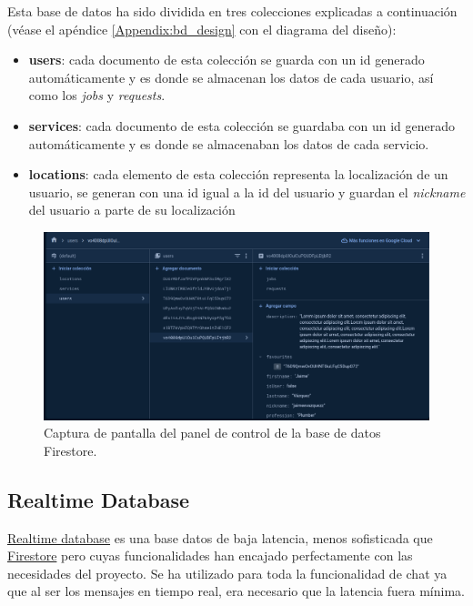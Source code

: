 Esta base de datos ha sido dividida en tres colecciones explicadas a continuación (véase el apéndice \ref{Appendix:bd_design} con el diagrama del diseño):
\begin{itemize}
    \item \textbf{users}: cada documento de esta colección se guarda con un id generado automáticamente y es donde se almacenan los datos de cada usuario, así como los \textit{jobs} y \textit{requests}.
    \item \textbf{services}: cada documento de esta colección se guardaba con un id generado automáticamente y es donde se almacenaban los datos de cada servicio.
    \item \textbf{locations}: cada elemento de esta colección representa la localización de un usuario, se generan con una id igual a la id del usuario y guardan el \textit{nickname} del usuario a parte de su localización
\end{itemize}
\begin{figure}[h]
    \centering
    \includegraphics[width = 1\textwidth]{Imagenes/Fuentes/ejemplo_firestore.png}
    \caption{Captura de pantalla del panel de control de la base de datos Firestore.}
    \label{fig:ejemplo_firestore}
\end{figure}
\subsection{Realtime Database}
\href{https://firebase.google.com/docs/database/}{Realtime database} es una base datos de baja latencia, menos sofisticada que \hyperlink{subsec:firestore}{Firestore} pero cuyas funcionalidades han encajado perfectamente con las necesidades del proyecto. Se ha utilizado para toda la funcionalidad de chat ya que al ser los mensajes en tiempo real, era necesario que la latencia fuera mínima. 

